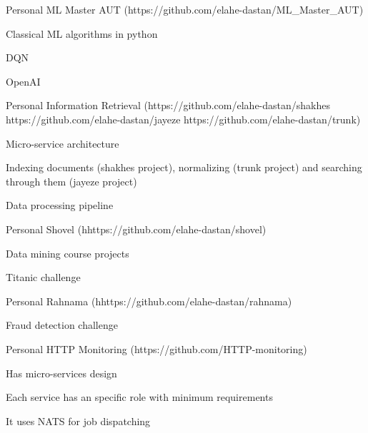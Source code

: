 \begin{cventries}
    \cventry
    {Personal} %
    {ML Master AUT ({\tiny https://github.com/elahe-dastan/ML\_Master\_AUT})} %
    {} %
    {} %
    {
      \begin{cvitems} %
        \item{Classical ML algorithms in python}
        \item{DQN}
        \item{OpenAI}
      \end{cvitems}
    }

    \cventry
    {Personal} %
    {Information Retrieval ({\tiny https://github.com/elahe-dastan/shakhes} {\tiny https://github.com/elahe-dastan/jayeze} {\tiny https://github.com/elahe-dastan/trunk})} %
    {} %
    {} %
    {
      \begin{cvitems} %
        \item{Micro-service architecture}
        \item{Indexing documents (shakhes project), normalizing (trunk project) and searching through them (jayeze project)}
        \item{Data processing pipeline}
      \end{cvitems}
    }

    \cventry
    {Personal} %
    {Shovel ({\tiny hhttps://github.com/elahe-dastan/shovel})} %
    {} %
    {} %
    {
      \begin{cvitems} %
        \item{Data mining course projects}
        \item{Titanic challenge}
      \end{cvitems}
    }

    \cventry
    {Personal} %
    {Rahnama ({\tiny hhttps://github.com/elahe-dastan/rahnama})} %
    {} %
    {} %
    {
      \begin{cvitems} %
        \item{Fraud detection challenge}
      \end{cvitems}
    }

    \cventry
    {Personal} %
    {HTTP Monitoring ({\tiny https://github.com/HTTP-monitoring})} %
    {} %
    {} %
    {
      \begin{cvitems} %
        \item{Has micro-services design}
        \item{Each service has an specific role with minimum requirements}
        \item{It uses NATS for job dispatching}
      \end{cvitems}
    }

\end{cventries}
